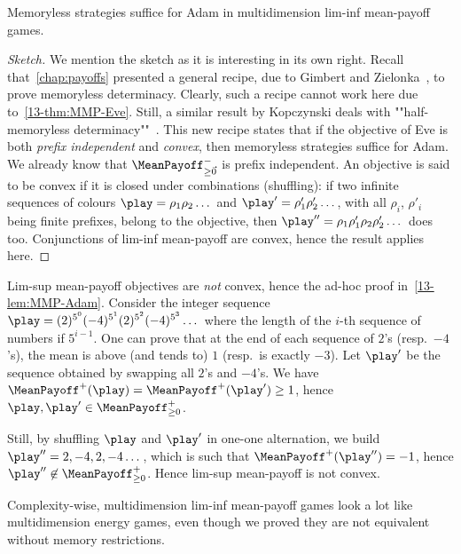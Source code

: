 \begin{lemma}
\label{13-lem:MPlimInfAdam}
Memoryless strategies suffice for Adam in multidimension lim-inf mean-payoff games.
\end{lemma}

\begin{proof}[Sketch]
We mention the sketch as it is interesting in its own right. Recall that~\cref{chap:payoffs} presented a general recipe, due to Gimbert and Zielonka~\cite{Gimbert&Zielonka:2004,Gimbert&Zielonka:2005}, to prove memoryless determinacy. Clearly, such a recipe cannot work here due to~\cref{13-thm:MMP-Eve}. Still, a similar result by Kopczynski deals with ""half-memoryless determinacy""~\cite{Kopczynski:2006}. This new recipe states that if the objective of Eve is both \textit{prefix independent} and \textit{convex}, then memoryless strategies suffice for Adam. We already know that $\MeanPayoff^{-}_{\geq \vec{0}}$ is prefix independent. An objective is said to be convex if it is closed under combinations (shuffling): if two infinite sequences of colours $\play = \rho_1 \rho_2 \ldots{}$ and $\play' = \rho'_1 \rho'_2 \ldots{}$, with all $\rho_i$, $\rho'_i$ being finite prefixes, belong to the objective, then $\play'' = \rho_1 \rho'_1 \rho_2 \rho'_2 \ldots{}$ does too. Conjunctions of lim-inf mean-payoff are convex, hence the result applies here.
\end{proof}

\begin{remark}
Lim-sup mean-payoff objectives are \textit{not} convex, hence the ad-hoc proof in~\cref{13-lem:MMP-Adam}. Consider the integer sequence $\play = (2)^{5^0} (-4)^{5^1} (2)^{5^2} (-4)^{5^3}\ldots{}$ where the length of the $i$-th sequence of numbers if $5^{i-1}$. One can prove that at the end of each sequence of $2$'s (resp.~$-4$'s), the mean is above (and tends to) $1$ (resp.~is exactly $-3$). Let $\play'$ be the sequence obtained by swapping all $2$'s and $-4$'s. We have $\MeanPayoff^{+}(\play) = \MeanPayoff^{+}(\play') \geq 1$, hence $\play, \play' \in \MeanPayoff^{+}_{\geq 0}$.

Still, by shuffling $\play$ and $\play'$ in one-one alternation, we build $\play'' = 2, -4, 2, -4 \ldots{}$, which is such that $\MeanPayoff^{+}(\play'') = -1$, hence  $\play'' \not\in \MeanPayoff^{+}_{\geq 0}$. Hence lim-sup mean-payoff is not convex.
\end{remark}

Complexity-wise, multidimension lim-inf mean-payoff games look a lot like multidimension energy games, even though we proved they are not equivalent without memory restrictions.

